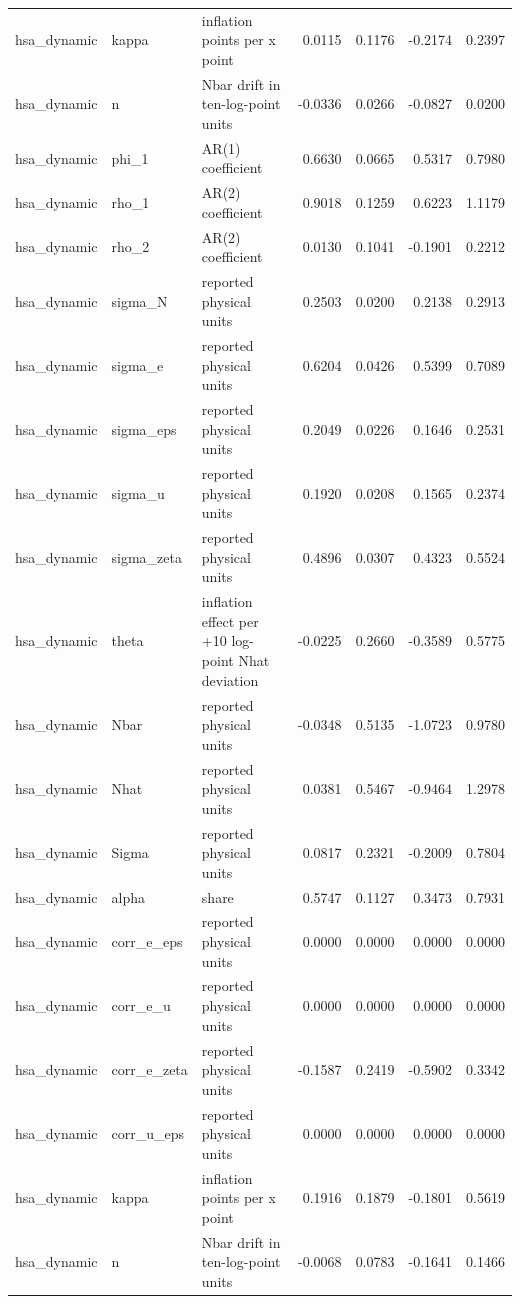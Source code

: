 \begin{tabular}{lllrrrr}
hsa\_dynamic & kappa & inflation points per x point & 0.0115 & 0.1176 & -0.2174 & 0.2397 \\
hsa\_dynamic & n & Nbar drift in ten-log-point units & -0.0336 & 0.0266 & -0.0827 & 0.0200 \\
hsa\_dynamic & phi\_1 & AR(1) coefficient & 0.6630 & 0.0665 & 0.5317 & 0.7980 \\
hsa\_dynamic & rho\_1 & AR(2) coefficient & 0.9018 & 0.1259 & 0.6223 & 1.1179 \\
hsa\_dynamic & rho\_2 & AR(2) coefficient & 0.0130 & 0.1041 & -0.1901 & 0.2212 \\
hsa\_dynamic & sigma\_N & reported physical units & 0.2503 & 0.0200 & 0.2138 & 0.2913 \\
hsa\_dynamic & sigma\_e & reported physical units & 0.6204 & 0.0426 & 0.5399 & 0.7089 \\
hsa\_dynamic & sigma\_eps & reported physical units & 0.2049 & 0.0226 & 0.1646 & 0.2531 \\
hsa\_dynamic & sigma\_u & reported physical units & 0.1920 & 0.0208 & 0.1565 & 0.2374 \\
hsa\_dynamic & sigma\_zeta & reported physical units & 0.4896 & 0.0307 & 0.4323 & 0.5524 \\
hsa\_dynamic & theta & inflation effect per +10 log-point Nhat deviation & -0.0225 & 0.2660 & -0.3589 & 0.5775 \\
hsa\_dynamic & Nbar & reported physical units & -0.0348 & 0.5135 & -1.0723 & 0.9780 \\
hsa\_dynamic & Nhat & reported physical units & 0.0381 & 0.5467 & -0.9464 & 1.2978 \\
hsa\_dynamic & Sigma & reported physical units & 0.0817 & 0.2321 & -0.2009 & 0.7804 \\
hsa\_dynamic & alpha & share & 0.5747 & 0.1127 & 0.3473 & 0.7931 \\
hsa\_dynamic & corr\_e\_eps & reported physical units & 0.0000 & 0.0000 & 0.0000 & 0.0000 \\
hsa\_dynamic & corr\_e\_u & reported physical units & 0.0000 & 0.0000 & 0.0000 & 0.0000 \\
hsa\_dynamic & corr\_e\_zeta & reported physical units & -0.1587 & 0.2419 & -0.5902 & 0.3342 \\
hsa\_dynamic & corr\_u\_eps & reported physical units & 0.0000 & 0.0000 & 0.0000 & 0.0000 \\
hsa\_dynamic & kappa & inflation points per x point & 0.1916 & 0.1879 & -0.1801 & 0.5619 \\
hsa\_dynamic & n & Nbar drift in ten-log-point units & -0.0068 & 0.0783 & -0.1641 & 0.1466 \\

\end{tabular}
